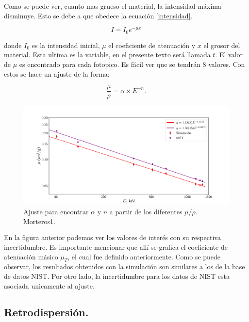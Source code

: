 Como se puede ver, cuanto mas grueso el material, la intensidad máxima disminuye. Esto se debe a que obedece la ecuación \ref{intensidad}. 

\begin{equation}\label{intensidad}
	I=I_0e^{-\mu x}
\end{equation}

donde $I_0$ es la intensidad inicial, $\mu$ el coeficiente de atenuación y $x$ el grosor del material. Esta ultima es la variable, en el presente texto será llamada $t$. El valor de $\mu$ es encontrado para cada fotopico. Es fácil ver que se tendrán 8 valores. Con estos se hace un ajuste de la forma:

\begin{equation}
	\frac{\mu}{\rho}=\alpha\times E^{-n}.
\end{equation}

\begin{figure}[H]
	\centering
	\includegraphics[width=1.0\linewidth]{Kap4/mu-trans-m1.pdf}
	\caption{Ajuste para encontrar $\alpha$ y $n$ a partir de los diferentes $\mu$/$\rho$. Morteros1.}
	\label{fig:mu-trans-m1}
\end{figure}

En la figura anterior podemos ver los valores de interés con su respectiva incertidumbre. Es importante mencionar que allí se grafica el coeficiente de atenuación másico $\mu_T$, el cual fue definido anteriormente. Como se puede observar, los resultados obtenidos con la simulación son similares a los de la base de datos NIST. Por otro lado, la incertidumbre para los datos de NIST esta asociada unicamente al ajuste.

 
\subsection{Retrodispersión.}

